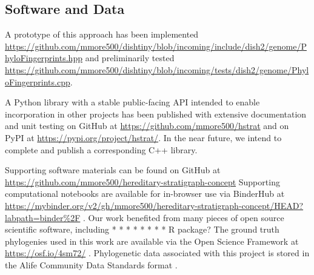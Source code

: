 \subsection{Software and Data}

A prototype of this approach has been implemented \url{https://github.com/mmore500/dishtiny/blob/incoming/include/dish2/genome/PhyloFingerprints.hpp} and preliminarily tested \url{https://github.com/mmore500/dishtiny/blob/incoming/tests/dish2/genome/PhyloFingerprints.cpp}.

A Python library with a stable public-facing API intended to enable incorporation in other projects has been published with extensive documentation and unit testing on GitHub at \url{https://github.com/mmore500/hstrat} and on PyPI at \url{https://pypi.org/project/hstrat/}.
In the near future, we intend to complete and publish a corresponding C++ library.

Supporting software materials can be found on GitHub at \url{https://github.com/mmore500/hereditary-stratigraph-concept}
Supporting computational notebooks are available for in-browser use via BinderHub at \url{https://mybinder.org/v2/gh/mmore500/hereditary-stratigraph-concept/HEAD?labpath=binder%2F} \citep{ragan2018binder}.
Our work benefited from many pieces of open source scientific software, including
* \citep{sukumaran2010dendropy}
* \citep{virtanen2020scipy}
* \citep{hunter2007matplotlib}
* \citep{virtanen2020scipy}
* \citep{waskom2021seaborn}
* \citep{bostock2011d3}
* \citep{meurer2017sympy}
* R package?
The ground truth phylogenies used in this work are available via the Open Science Framework at
\url{https://osf.io/4sm72/} \citep{moreno2022hstratconceptsupplement} \citep{foster2017open}.
Phylogenetic data associated with this project is stored in the Alife Community Data Standards format \citep{lalejini2019data}.
